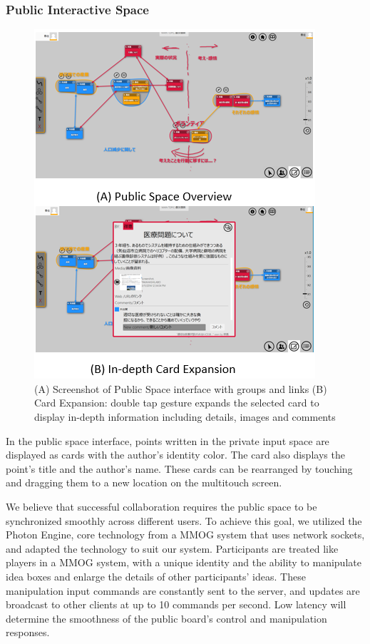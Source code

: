 \documentclass{sigchi}
\begin{document}
\subsubsection{Public Interactive Space}

\begin{figure}[!h]
\centering
\includegraphics[width=1.0\columnwidth]{public4}
\caption{(A) Screenshot of Public Space interface with groups and links (B) Card Expansion: double tap gesture expands the selected card to display in-depth information including details, images and comments}
\label{fig:figure1}
\end{figure}
In the public space interface, points written in the private input space are displayed as cards with the author's identity color. The card also displays the point's title and the author's name. These cards can be rearranged by touching and dragging them to a new location on the multitouch screen.

We believe that successful collaboration requires the public space to be synchronized smoothly across different users. To achieve this goal, we utilized the Photon Engine, core technology from a MMOG system that uses network sockets, and adapted the technology to suit our system. Participants are treated like players in a MMOG system, with a unique identity and the ability to manipulate idea boxes and enlarge the details of other participants' ideas. These manipulation input commands are constantly sent to the server, and updates are broadcast to other clients at up to 10 commands per second.  Low latency will determine the smoothness of the public board's control and manipulation responses. 
\end{document}
